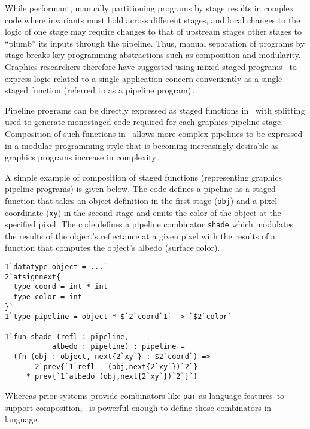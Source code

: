 While performant, manually partitioning programs by stage results in
complex code where invariants must hold across different stages, and
local changes to the logic of one stage may require changes to that of
upstream stages other stages to ``plumb'' its inputs through the
pipeline.  Thus, manual separation of programs by stage breaks key
programming abstractions such as composition and modularity.  Graphics
researchers therefore have suggested using mixed-staged programs
\,\cite{Proudfoot:2001,Foley:2011,He:2014} to express logic related to
a single application concern conveniently as a single staged function
(referred to as a pipeline program)\,\cite{Foley:2011}.

Pipeline programs can be directly expressed as staged functions in
\lang\ with splitting used to generate monostaged code required for
each graphics pipeline stage. Composition of such functions in
\lang\ allows more complex pipelines to be expressed in a modular
programming style that is becoming increasingly desirable as graphics
programs increase in complexity\,\cite{Foley:2011,He:2014}.

A simple example of composition of staged functions (representing graphics
pipeline programs) is given below.  The code defines a pipeline as a
staged function that takes an object definition in the first stage
(\texttt{obj}) and a pixel coordinate (\texttt{xy}) in the second
stage and emits the color of the object at the specified pixel. The
code defines a pipeline combinator \texttt{shade} which modulates the
results of the object's reflectance at a given pixel with the results
of a function that computes the object's albedo (surface color).
%
\begin{lstlisting} 
1`datatype object = ...`
2`atsignnext{
  type coord = int * int
  type color = int
}`
1`type pipeline = object * $`2`coord`1` -> `$2`color`

1`fun shade (refl : pipeline,
           albedo : pipeline) : pipeline =
  (fn (obj : object, next{2`xy`} : $2`coord`) =>
       2`prev{`1`refl   (obj,next{2`xy`})`2`}
     * prev{`1`albedo (obj,next{2`xy`})`2`}`)
\end{lstlisting}
%
Whereas prior systems provide combinators like \texttt{par} as
language features\,\cite{Foley:2011} to support composition, \lang\ is
powerful enough to define those combinators in-language.



